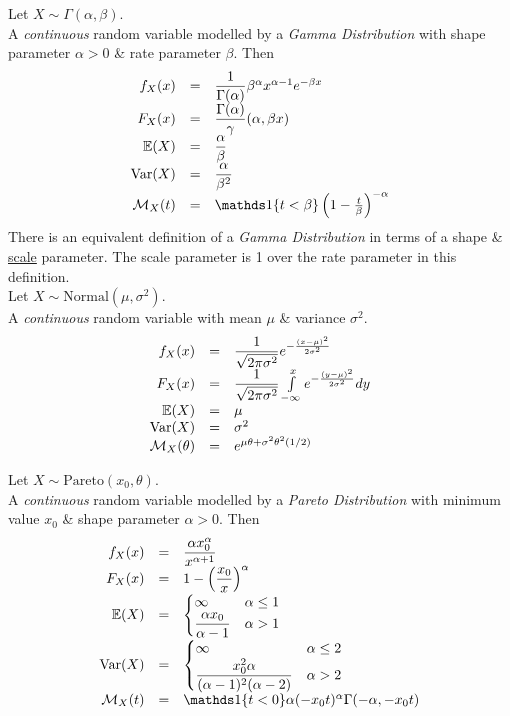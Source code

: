 \documentclass[11pt,a4paper]{article}
\begin{document}
Let $X\sim\Gamma(\alpha,\beta)$.\\
A \textit{continuous} random variable modelled by a \textit{Gamma Distribution} with shape parameter $\alpha>0$ \& rate parameter $\beta$. Then
\[\begin{array}{rcll}
f_X(x)&=&\dfrac{1}{\Gamma(\alpha)}\beta^\alpha x^{\alpha-1}e^{-\beta x}\\
F_X(x)&=&\dfrac{\Gamma(\alpha)}\gamma(\alpha,\beta x)\\
\expect(X)&=&\dfrac{\alpha}{\beta}\\
\var(X)&=&\dfrac{\alpha}{\beta^2}\\
\mathcal{M}_X(t)&=&\indicator\{t<\beta\}\left(1-\frac{t}{\beta}\right)^{-\alpha}
\end{array}\]
\nb There is an equivalent definition of a \textit{Gamma Distribution} in terms of a shape \& \underline{scale} parameter. The scale parameter is 1 over the rate parameter in this definition.\\

Let $X\sim\text{Normal}(\mu,\sigma^2)$.\\
A \textit{continuous} random variable  with mean $\mu$ \& variance $\sigma^2$.
\[\begin{array}{rcl}
f_X(x)&=&\dfrac{1}{\sqrt{2\pi\sigma^2}}e^{-\frac{(x-\mu)^2}{2\sigma^2}}\\
F_X(x)&=&\dfrac{1}{\sqrt{2\pi\sigma^2}}\int\limits_{-\infty}^xe^{-\frac{(y-\mu)^2}{2\sigma^2}}dy\\
\mathbb{E}(X)&=&\mu\\
\mathrm{Var}(X)&=&\sigma^2\\
\mathcal{M}_X(\theta)&=&e^{\mu\theta+\sigma^2\theta^2(1/2)}
\end{array}\]

Let $X\sim\text{Pareto}(x_0,\theta)$.\\
A \textit{continuous} random variable modelled by a \textit{Pareto Distribution} with minimum value $x_0$ \& shape parameter $\alpha>0$. Then
\[\begin{array}{rcll}
f_X(x)&=&\dfrac{\alpha x_0^\alpha}{x^{\alpha+1}}\\
F_X(x)&=&1-\left(\dfrac{x_0}{x}\right)^\alpha\\
\expect(X)&=&\begin{cases}\infty&\alpha\leq1\\\dfrac{\alpha x_0}{\alpha-1}&\alpha>1\end{cases}\\
\var(X)&=&\begin{cases}\infty&\alpha\leq2\\\dfrac{x_0^2\alpha}{(\alpha-1)^2(\alpha-2)}&\alpha>2\end{cases}\\
\mathcal{M}_X(t)&=&\indicator\{t<0\}\alpha(-x_0t)^\alpha\Gamma(-\alpha,-x_0t)
\end{array}\]
\end{document}

